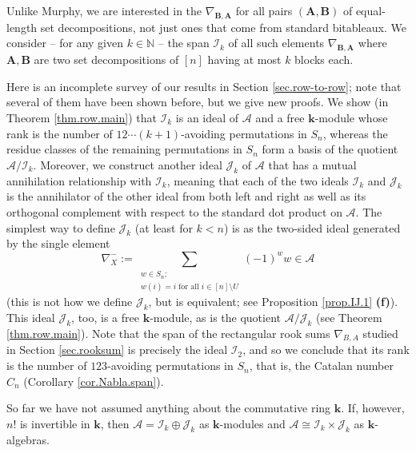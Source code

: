 \documentclass[numbers=enddot,12pt,final,onecolumn,notitlepage]{scrartcl}%
\numberwithin{exer}{subsection}
\theoremstyle{definition}
\let\sumnonlimits\sum
\renewcommand{\sum}{\sumnonlimits\limits}
\begin{document}
Unlike Murphy, we are interested in the $\nabla_{\mathbf{B},\mathbf{A}}$ for
all pairs $\left(  \mathbf{A},\mathbf{B}\right)  $ of equal-length set
decompositions, not just ones that come from standard bitableaux. We consider
-- for any given $k\in\mathbb{N}$ -- the span $\mathcal{I}_{k}$ of all such
elements $\nabla_{\mathbf{B},\mathbf{A}}$ where $\mathbf{A},\mathbf{B}$ are
two set decompositions of $\left[  n\right]  $ having at most $k$ blocks each.

Here is an incomplete survey of our results in Section \ref{sec.row-to-row};
note that several of them have been shown before, but we give new proofs. We
show (in Theorem \ref{thm.row.main}) that $\mathcal{I}_{k}$ is an ideal of
$\mathcal{A}$ and a free $\mathbf{k}$-module whose rank is the number of
$12\cdots\left(  k+1\right)  $-avoiding permutations in $S_{n}$, whereas the
residue classes of the remaining permutations in $S_{n}$ form a basis of the
quotient $\mathcal{A}/\mathcal{I}_{k}$. Moreover, we construct another ideal
$\mathcal{J}_{k}$ of $\mathcal{A}$ that has a mutual annihilation relationship
with $\mathcal{I}_{k}$, meaning that each of the two ideals $\mathcal{I}_{k}$
and $\mathcal{J}_{k}$ is the annihilator of the other ideal from both left and
right as well as its orthogonal complement with respect to the standard dot
product on $\mathcal{A}$. The simplest way to define $\mathcal{J}_{k}$ (at
least for $k<n$) is as the two-sided ideal generated by the single element
\[
\nabla_{X}^{-}:=\sum_{\substack{w\in S_{n};\\w\left(  i\right)  =i\text{ for
all }i\in\left[  n\right]  \setminus U}}\left(  -1\right)  ^{w}w\in\mathcal{A}%
\]
(this is not how we define $\mathcal{J}_{k}$, but is equivalent; see
Proposition \ref{prop.IJ.1} \textbf{(f)}). This ideal $\mathcal{J}_{k}$, too,
is a free $\mathbf{k}$-module, as is the quotient $\mathcal{A}/\mathcal{J}%
_{k}$ (see Theorem \ref{thm.row.main}). Note that the span of the rectangular
rook sums $\nabla_{B,A}$ studied in Section \ref{sec.rooksum} is precisely the
ideal $\mathcal{I}_{2}$, and so we conclude that its rank is the number of
$123$-avoiding permutations in $S_{n}$, that is, the Catalan number $C_{n}$
(Corollary \ref{cor.Nabla.span}).

So far we have not assumed anything about the commutative ring $\mathbf{k}$.
If, however, $n!$ is invertible in $\mathbf{k}$, then $\mathcal{A}%
=\mathcal{I}_{k}\oplus\mathcal{J}_{k}$ as $\mathbf{k}$-modules and
$\mathcal{A}\cong\mathcal{I}_{k}\times\mathcal{J}_{k}$ as $\mathbf{k}$-algebras.
\end{document}
